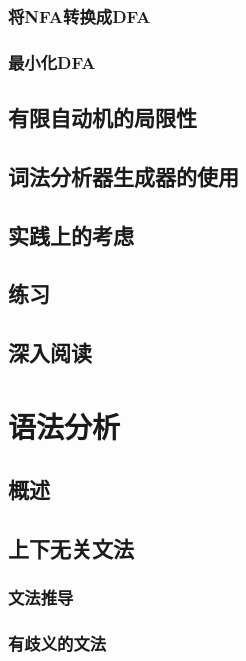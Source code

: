 \documentclass[cn,11pt,chinese]{elegantbook}
\begin{document}
\subsection{将NFA转换成DFA}

\subsection{最小化DFA}

\section{有限自动机的局限性}

\section{词法分析器生成器的使用}

\section{实践上的考虑}

\section{练习}

\section{深入阅读}

\chapter{语法分析}

\section{概述}

\section{上下无关文法}

\subsection{文法推导}

\subsection{有歧义的文法}
\end{document}
